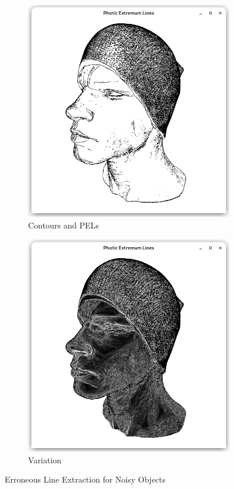 \documentclass[9pt,fleqn,twoside,twocolumn]{stdglobal}
\begin{document}
  \begin{figure}
    \centering
    \begin{subfigure}[b]{0.49\linewidth}
      \centering
      \includegraphics[width=\textwidth,trim={15px 15 15 50},clip]{images/head-contour-pel-shader.png}
      \caption{Contours and PELs}
    \end{subfigure}
    \begin{subfigure}[b]{0.49\linewidth}
      \centering
      \includegraphics[width=\textwidth,trim={15px 15 15 50},clip]{images/head-light-variation.png}
      \caption{Variation}
    \end{subfigure}
    \caption{Erroneous Line Extraction for Noisy Objects}
  \end{figure}
\end{document}
